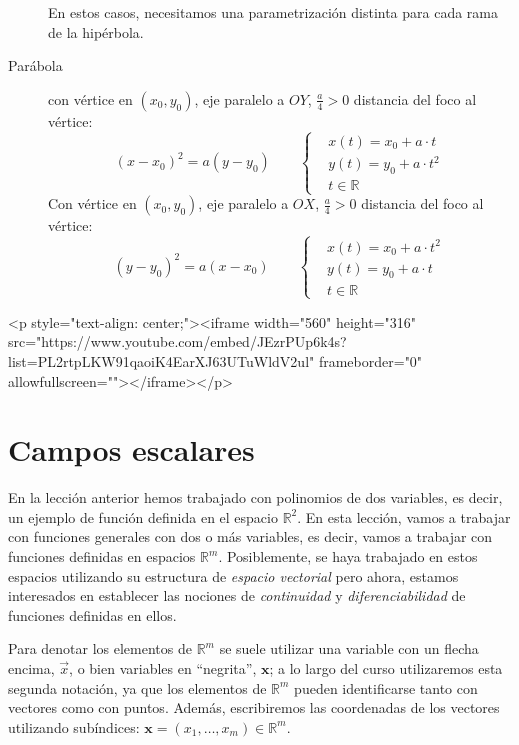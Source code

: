 \begin{description}
En estos casos, necesitamos una parametrización distinta para cada rama de la hipérbola.

\item[Parábola] con vértice en $(x_0,y_0)$, eje paralelo a $OY$, $\frac a4>0$ distancia del foco al vértice:
\[
(x-x_0)^2=a(y-y_0)
\qquad\begin{cases}
& x(t)= x_0+a\cdot t \\
& y(t)= y_0+a\cdot t^2\\
& t\in\mathbb{R}
\end{cases}
\]
Con vértice en $(x_0,y_0)$, eje paralelo a $OX$, $\frac a4>0$ distancia del foco al vértice:
\[
(y-y_0)^2=a(x-x_0)\qquad
\begin{cases}
& x(t)= x_0+a\cdot t^2\\
& y(t)= y_0+a\cdot t \\
& t\in\mathbb{R}
\end{cases}
\]

\end{description}

\begin{rawhtml}
<p style="text-align: center;"><iframe width="560" height="316" src="https://www.youtube.com/embed/JEzrPUp6k4s?list=PL2rtpLKW91qaoiK4EarXJ63UTuWldV2ul" frameborder="0" allowfullscreen=""></iframe></p>
\end{rawhtml}

%

\newpage


\section{Campos escalares}

En la lección anterior hemos trabajado con polinomios de dos variables, es decir, un ejemplo de función definida en el espacio $\mathbb{R}^2$.
En esta lección, vamos a trabajar con funciones generales con dos o más variables, es decir, vamos a trabajar con funciones definidas en espacios $\mathbb{R}^m$.
Posiblemente, se haya trabajado en estos espacios utilizando su estructura de \emph{espacio vectorial} pero ahora, estamos interesados en establecer las nociones de \emph{continuidad} y
\emph{diferenciabilidad} de funciones definidas en ellos.

Para denotar los elementos de $\mathbb{R}^m$ se suele utilizar una variable con un flecha encima, $\vec{x}$, o bien variables en ``negrita'', $\boldsymbol{x}$;
a lo largo del curso utilizaremos esta segunda notación, ya que los elementos de $\mathbb{R}^m$ pueden identificarse tanto con vectores como con puntos.
Además, escribiremos las coordenadas de los vectores utilizando subíndices:
$\boldsymbol{x}=(x_1,\dots,x_m)\in\mathbb{R}^m$.

